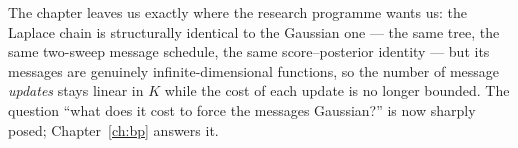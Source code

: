 The chapter leaves us exactly where the research programme wants us: the
Laplace chain is structurally identical to the Gaussian one --- the same
tree, the same two-sweep message schedule, the same score--posterior
identity --- but its messages are genuinely infinite-dimensional functions,
so the number of message \emph{updates} stays linear in $K$ while the cost
of each update is no longer bounded. The question ``what does it cost to
force the messages Gaussian?'' is now sharply posed; Chapter~\ref{ch:bp}
answers it.
